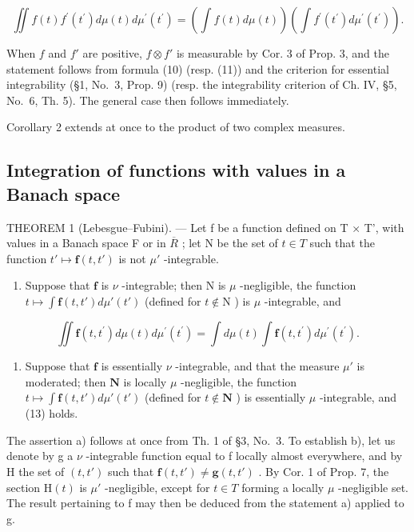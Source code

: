 \[
\iint f (t) f ^ {\prime} \left(t ^ {\prime}\right) d \mu (t) d \mu^ {\prime} \left(t ^ {\prime}\right) = \left(\int f (t) d \mu (t)\right) \left(\int f ^ {\prime} \left(t ^ {\prime}\right) d \mu^ {\prime} \left(t ^ {\prime}\right)\right).\tag{12}
\]

When \(f\) and \(f'\) are positive, \(f \otimes f'\) is measurable by Cor. 3 of Prop. 3, and the statement follows from formula (10) (resp. (11)) and the criterion for essential integrability (§1, No.~3, Prop. 9) (resp. the integrability criterion of Ch. IV, §5, No.~6, Th. 5). The general case then follows immediately.

Corollary 2 extends at once to the product of two complex measures.

\subsection{Integration of functions with values in a Banach space}

THEOREM 1 (Lebesgue--Fubini). --- Let f be a function defined on T × T', with values in a Banach space F or in \(\overline{R}\) ; let N be the set of \(t \in T\) such that the function \(t' \mapsto \mathbf{f}(t, t')\) is not \(\mu'\) -integrable.

\begin{enumerate}
\def\labelenumi{\alph{enumi})}
\tightlist
\item
  Suppose that \(\mathbf{f}\) is \(\nu\) -integrable; then \(\mathrm{N}\) is \(\mu\) -negligible, the function \(t \mapsto \int \mathbf{f}(t, t') d\mu'(t')\) (defined for \(t \notin \mathrm{N}\) ) is \(\mu\) -integrable, and
\end{enumerate}

\[
\iint \mathbf {f} (t, t ^ {\prime}) d \mu (t) d \mu^ {\prime} (t ^ {\prime}) = \int d \mu (t) \int \mathbf {f} (t, t ^ {\prime}) d \mu^ {\prime} (t ^ {\prime}).\tag{13}
\]

\begin{enumerate}
\def\labelenumi{\alph{enumi})}
\setcounter{enumi}{1}
\tightlist
\item
  Suppose that \(\mathbf{f}\) is essentially \(\nu\) -integrable, and that the measure \(\mu'\) is moderated; then \(\mathbf{N}\) is locally \(\mu\) -negligible, the function \(t \mapsto \int \mathbf{f}(t, t') d\mu'(t')\) (defined for \(t \notin \mathbf{N}\) ) is essentially \(\mu\) -integrable, and (13) holds.
\end{enumerate}

The assertion a) follows at once from Th. 1 of §3, No.~3. To establish b), let us denote by g a \(\nu\) -integrable function equal to f locally almost everywhere, and by H the set of \((t, t')\) such that \(\mathbf{f}(t, t') \neq \mathbf{g}(t, t')\) . By Cor. 1 of Prop. 7, the section \(\mathrm{H}(t)\) is \(\mu'\) -negligible, except for \(t \in T\) forming a locally \(\mu\) -negligible set. The result pertaining to f may then be deduced from the statement a) applied to g.

